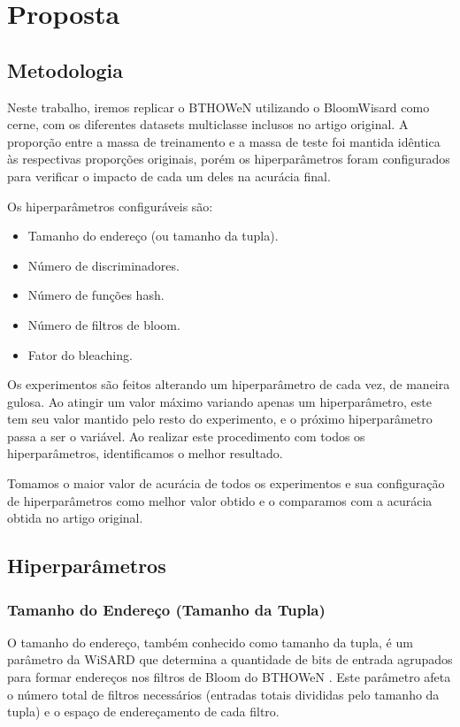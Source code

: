 \documentclass{article}
\begin{document}
\section{Proposta}
\subsection{Metodologia}

Neste trabalho, iremos replicar o BTHOWeN utilizando o BloomWisard como cerne, com os diferentes datasets multiclasse inclusos no artigo original. A proporção entre a massa de treinamento e a massa de teste foi mantida idêntica às respectivas proporções originais, porém os hiperparâmetros foram configurados para verificar o impacto de cada um deles na acurácia final.

Os hiperparâmetros configuráveis são:

\begin{itemize}
    \item Tamanho do endereço (ou tamanho da tupla).
    \item Número de discriminadores.
    \item Número de funções hash.
    \item Número de filtros de bloom.
    \item Fator do bleaching.
\end{itemize}

Os experimentos são feitos alterando um hiperparâmetro de cada vez, de maneira gulosa. Ao atingir um valor máximo variando apenas um hiperparâmetro, este tem seu valor mantido pelo resto do experimento, e o próximo hiperparâmetro passa a ser o variável. Ao realizar este procedimento com todos os hiperparâmetros, identificamos o melhor resultado.

Tomamos o maior valor de acurácia de todos os experimentos e sua configuração de hiperparâmetros como melhor valor obtido e o comparamos com a acurácia obtida no artigo original.

\subsection{Hiperparâmetros}

\subsubsection{Tamanho do Endereço (Tamanho da Tupla)}

O tamanho do endereço, também conhecido como tamanho da tupla, é um parâmetro da WiSARD que determina a quantidade de bits de entrada agrupados para formar endereços nos filtros de Bloom do BTHOWeN \cite{lima2020wisardpkg, santiago2023}. Este parâmetro afeta o número total de filtros necessários (entradas totais divididas pelo tamanho da tupla) e o espaço de endereçamento de cada filtro.
\end{document}
